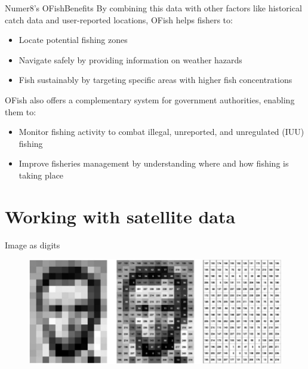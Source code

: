 \documentclass[aspectratio=169]{beamer} %
\begin{document}
    \begin{frame}{Numer8's OFish}{Benefits}
      By combining this data with other factors like historical catch data and user-reported locations, OFish helps fishers to:
      
      \begin{itemize}
          \item Locate potential fishing zones
          \item Navigate safely by providing information on weather hazards
          \item Fish sustainably by targeting specific areas with higher fish concentrations
      \end{itemize}
      
      OFish also offers a complementary system for government authorities, enabling them to:
      
      \begin{itemize}
          \item Monitor fishing activity to combat illegal, unreported, and unregulated (IUU) fishing
          \item Improve fisheries management by understanding where and how fishing is taking place
      \end{itemize}
      
    \end{frame}
        
        \section{Working with satellite data}
        
        \begin{frame}{Image as digits}
        
        \begin{figure}
          \includegraphics[width=1\linewidth]{image_matrix.png}
        \end{figure}
        \end{frame}
        
\end{document}
